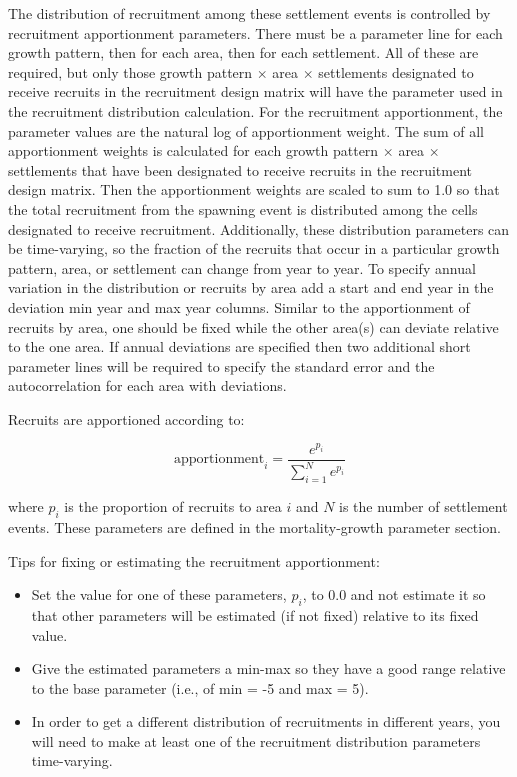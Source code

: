 The distribution of recruitment among these settlement events is controlled by recruitment apportionment parameters. There must be a parameter line for each growth pattern, then for each area, then for each settlement. All of these are required, but only those growth pattern $\times$ area $\times$ settlements designated to receive recruits in the recruitment design matrix will have the parameter used in the recruitment distribution calculation. For the recruitment apportionment, the parameter values are the natural log of apportionment weight. The sum of all apportionment weights is calculated for each growth pattern $\times$ area $\times$ settlements that have been designated to receive recruits in the recruitment design matrix. Then the apportionment weights are scaled to sum to 1.0 so that the total recruitment from the spawning event is distributed among the cells designated to receive recruitment. Additionally, these distribution parameters can be time-varying, so the fraction of the recruits that occur in a particular growth pattern, area, or settlement can change from year to year. To specify annual variation in the distribution or recruits by area add a start and end year in the deviation min year and max year columns. Similar to the apportionment of recruits by area, one should be fixed while the other area(s) can deviate relative to the one area. If annual deviations are specified then two additional short parameter lines will be required to specify the standard error and the autocorrelation for each area with deviations.

\hypertarget{recdist}{}
Recruits are apportioned according to:

\begin{equation}
	\text{apportionment}_i = \frac{e^{p_i}}{\sum_{i=1}^{N}e^{p_i}}
\end{equation}

where $p_i$ is the proportion of recruits to area $i$ and $N$ is the number of settlement events. These parameters are defined in the mortality-growth parameter section.

Tips for fixing or estimating the recruitment apportionment:
\begin{itemize}
	\item Set the value for one of these parameters, $p_i$, to 0.0 and not estimate it so that other parameters will be estimated (if not fixed) relative to its fixed value.
	\item Give the estimated parameters a min-max so they have a good range relative to the base parameter (i.e., of min = -5 and max = 5).
	\item In order to get a different distribution of recruitments in different years, you will need to make at least one of the recruitment distribution parameters time-varying.
\end{itemize}	

